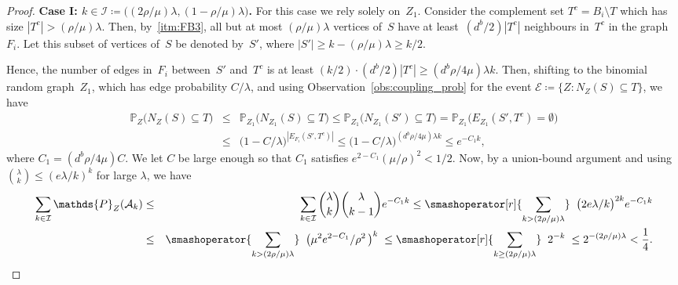\documentclass[final]{article}
\theoremstyle{definition}
\begin{document}
\begin{proof}
    \noindent \textbf{Case I: $k \in \mathcal{I} \coloneqq \bigl( (2\rho/\mu)\lambda, ( 1 - \rho/\mu)\lambda\bigr)$.} For this case we rely solely on~$Z_1$. Consider the complement set $T^c = B_i\setminus T$ which has size $|T^c| > (\rho/\mu)\lambda$. Then, by~\ref{itm:FB3}, all but at most $(\rho/\mu)\lambda$ vertices of~$S$ have at least~$(d^b/2)|T^c|$ neighbours in~$T^c$ in the graph~$F_i$. Let this subset of vertices of~$S$ be denoted by~$S'$, where $|S'| \geq k - (\rho/\mu)\lambda \geq k/2$. 
    
    Hence, the number of edges in~$F_i$ between~$S'$ and~$T^c$ is at least $(k/2)\cdot(d^b/{2})|T^c| \geq (d^b\rho/4\mu) \lambda k$. Then, shifting to the binomial random graph~$Z_1$, which has edge probability $C/\lambda$, and using Observation~\ref{obs:coupling_prob} for the event $\mathcal{E} \coloneqq \{Z: N_Z(S) \subseteq T\}$, we have 
    \begin{eqnarray*}
        \mathds{P}_Z\bigl(N_Z(S) \subseteq T\bigr) &\leq& \mathds{P}_{Z_1}\!\bigl(N_{Z_1}\!(S) \subseteq T\bigr) \leq \mathds{P}_{Z_1}\!\bigl(N_{Z_1}\!(S') \subseteq T\bigr) = \mathds{P}_{Z_1}\!\bigl(E_{Z_1}\!(S', T^c) = \emptyset \bigr)\\
        &\leq& \bigl(1 - C/\lambda\bigr)^{|E_{F_i}(S', T^c)|} \leq \bigl(1 - C/\lambda\bigr)^{(d^b \rho/{4 \mu}) \lambda k} \leq e^{-C_{1}k},
    \end{eqnarray*}
    where $C_1 = (d^b \rho/4 \mu)C$. We let $C$ be large enough so that $C_1$ satisfies $e^{2-C_1}(\mu/ \rho)^2 < 1/2$. Now, by a union-bound argument and using $\binom{\lambda}{k} \leq (e\lambda/k)^k$ for large $\lambda$, we have    
    \begin{eqnarray*}
        \sum_{k \in \mathcal{I}} \mathds{P}_Z(\mathcal{A}_k) &\leq& \sum_{k \in \mathcal{I}} \binom{\lambda}{k}\binom{\lambda}{k-1} e^{-C_1k} \leq \smashoperator[r]{\sum_{k > (2\rho/\mu)\lambda}}\;\; \bigl({2e\lambda}/{k}\bigr)^{2k} e^{-C_1k}\\
        &\leq& \smashoperator{\sum_{k > (2\rho/\mu)\lambda}}\;\; \bigl(\mu^2 e^{2-C_1}/\rho^2\,\bigr)^{k} \;\leq \smashoperator[r]{\sum_{k \geq (2\rho/\mu)\lambda}}\;\; 2^{-k} \;\leq 2^{-(2\rho/\mu)\lambda} < \frac{1}{4}.
    \end{eqnarray*}
    

\end{proof}
\end{document}
